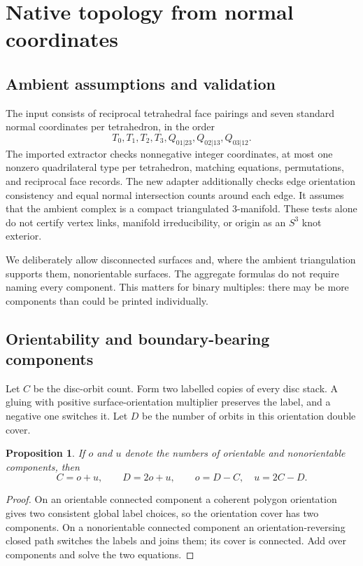 \documentclass[11pt,a4paper]{article}
\newtheorem{proposition}[theorem]{Proposition}
\theoremstyle{definition}\newtheorem{definition}[theorem]{Definition}
\theoremstyle{remark}\newtheorem{remark}[theorem]{Remark}
\begin{document}
\section{Native topology from normal coordinates}
\label{sec:normal}

\subsection{Ambient assumptions and validation}

The input consists of reciprocal tetrahedral face pairings and seven
standard normal coordinates per tetrahedron, in the order
\[
 T_0,T_1,T_2,T_3,Q_{01|23},Q_{02|13},Q_{03|12}.
\]
The imported extractor checks nonnegative integer coordinates, at most one
nonzero quadrilateral type per tetrahedron, matching equations, permutations,
and reciprocal face records. The new adapter additionally checks edge
orientation consistency and equal normal intersection counts around each
edge. It assumes that the ambient complex is a compact triangulated
3-manifold. These tests alone do not certify vertex links, manifold
irreducibility, or origin as an $S^3$ knot exterior.

We deliberately allow disconnected surfaces and, where the ambient
triangulation supports them, nonorientable surfaces. The aggregate formulas
do not require naming every component. This matters for binary multiples:
there may be more components than could be printed individually.

\subsection{Orientability and boundary-bearing components}

Let $C$ be the disc-orbit count. Form two labelled copies of every disc
stack. A gluing with positive surface-orientation multiplier preserves the
label, and a negative one switches it. Let $D$ be the number of orbits in
this orientation double cover.

\begin{proposition}\label{prop:orientation}
If $o$ and $u$ denote the numbers of orientable and nonorientable components,
then
\[
 C=o+u,\qquad D=2o+u,
 \qquad o=D-C,\quad u=2C-D.
\]
\end{proposition}
\begin{proof}
On an orientable connected component a coherent polygon orientation gives
two consistent global label choices, so the orientation cover has two
components. On a nonorientable connected component an orientation-reversing
closed path switches the labels and joins them; its cover is connected.
Add over components and solve the two equations.
\end{proof}
\end{document}
